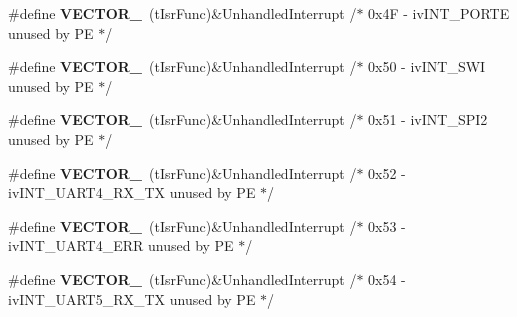 \begin{DoxyCompactItemize}
\item 
\#define {\bfseries V\+E\+C\+T\+O\+R\+\_}~(t\+Isr\+Func)\&Unhandled\+Interrupt         /$\ast$ 0x4\+F -\/    iv\+I\+N\+T\+\_\+\+P\+O\+R\+T\+E                    unused by P\+E $\ast$/\hypertarget{group___vectors___config__module_ga43deabcad3a82edec998de6f121784ca}{}\label{group___vectors___config__module_ga43deabcad3a82edec998de6f121784ca}

\item 
\#define {\bfseries V\+E\+C\+T\+O\+R\+\_}~(t\+Isr\+Func)\&Unhandled\+Interrupt         /$\ast$ 0x50 -\/    iv\+I\+N\+T\+\_\+\+S\+W\+I                      unused by P\+E $\ast$/\hypertarget{group___vectors___config__module_ga5572c810405314d6e7c33c25be3802b8}{}\label{group___vectors___config__module_ga5572c810405314d6e7c33c25be3802b8}

\item 
\#define {\bfseries V\+E\+C\+T\+O\+R\+\_}~(t\+Isr\+Func)\&Unhandled\+Interrupt         /$\ast$ 0x51 -\/    iv\+I\+N\+T\+\_\+\+S\+P\+I2                     unused by P\+E $\ast$/\hypertarget{group___vectors___config__module_gabc9e65f28dd467142034ba30140b5402}{}\label{group___vectors___config__module_gabc9e65f28dd467142034ba30140b5402}

\item 
\#define {\bfseries V\+E\+C\+T\+O\+R\+\_}~(t\+Isr\+Func)\&Unhandled\+Interrupt         /$\ast$ 0x52 -\/    iv\+I\+N\+T\+\_\+\+U\+A\+R\+T4\+\_\+\+R\+X\+\_\+\+T\+X              unused by P\+E $\ast$/\hypertarget{group___vectors___config__module_ga59ba6fe4b661421e68261ee13a2e91cd}{}\label{group___vectors___config__module_ga59ba6fe4b661421e68261ee13a2e91cd}

\item 
\#define {\bfseries V\+E\+C\+T\+O\+R\+\_}~(t\+Isr\+Func)\&Unhandled\+Interrupt         /$\ast$ 0x53 -\/    iv\+I\+N\+T\+\_\+\+U\+A\+R\+T4\+\_\+\+E\+R\+R                unused by P\+E $\ast$/\hypertarget{group___vectors___config__module_gad02da3d3c101992f4c344ef00c971388}{}\label{group___vectors___config__module_gad02da3d3c101992f4c344ef00c971388}

\item 
\#define {\bfseries V\+E\+C\+T\+O\+R\+\_}~(t\+Isr\+Func)\&Unhandled\+Interrupt         /$\ast$ 0x54 -\/    iv\+I\+N\+T\+\_\+\+U\+A\+R\+T5\+\_\+\+R\+X\+\_\+\+T\+X              unused by P\+E $\ast$/\hypertarget{group___vectors___config__module_ga097e2a197d8c4e4ee108dd7b1c1c398b}{}\label{group___vectors___config__module_ga097e2a197d8c4e4ee108dd7b1c1c398b}


\end{DoxyCompactItemize}

